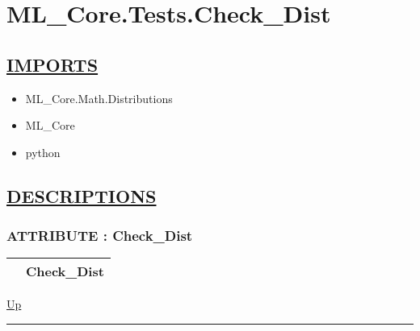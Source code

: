\chapter*{ML\_Core.Tests.Check\_Dist}
\hypertarget{ecldoc:toc:ML_Core.Tests.Check_Dist}{}

\section*{\underline{IMPORTS}}
\begin{itemize}
\item ML\_Core.Math.Distributions
\item ML\_Core
\item python
\end{itemize}

\section*{\underline{DESCRIPTIONS}}
\subsection*{ATTRIBUTE : Check\_Dist}
\hypertarget{ecldoc:ml_core.tests.check_dist}{}

{\renewcommand{\arraystretch}{1.5}
\begin{tabularx}{\textwidth}{|>{\raggedright\arraybackslash}l|X|}
\hline
\hspace{0pt} & Check\_Dist \\
\hline
\end{tabularx}
}

\hyperlink{ecldoc:toc:ML_Core/Tests}{Up}

\par


\rule{\textwidth}{0.4pt}
